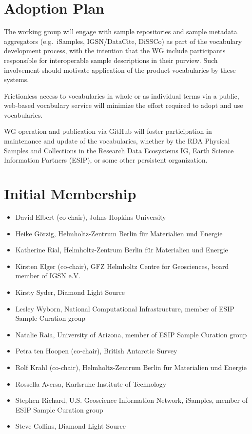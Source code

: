 \documentclass{scrartcl}
\begin{document}
\section{Adoption Plan}

The working group will engage with sample repositories and sample
metadata aggregators (e.g.\ iSamples, IGSN/DataCite, DiSSCo) as part
of the vocabulary development process, with the intention that the WG
include participants responsible for interoperable sample descriptions
in their purview.  Such involvement should motivate application of the
product vocabularies by these systems.

Frictionless access to vocabularies in whole or as individual terms
via a public, web-based vocabulary service will minimize the effort
required to adopt and use vocabularies.

WG operation and publication via GitHub will foster participation in
maintenance and update of the vocabularies, whether by the RDA
Physical Samples and Collections in the Research Data Ecosystems IG,
Earth Science Information Partners (ESIP), or some other persistent
organization.

\section{Initial Membership}

\begin{itemize}
\item David Elbert (co-chair), Johns Hopkins University
\item Heike Görzig,
  Helmholtz-Zentrum Berlin für Materialien und Energie
\item Katherine Rial,
  Helmholtz-Zentrum Berlin für Materialien und Energie
\item Kirsten Elger (co-chair),
  GFZ Helmholtz Centre for Geosciences, board member of IGSN e.V.
\item Kirsty Syder, Diamond Light Source
\item Lesley Wyborn,
  National Computational Infrastructure, member of ESIP Sample Curation group
\item Natalie Raia,
  University of Arizona, member of ESIP Sample Curation group
\item Petra ten Hoopen (co-chair), British Antarctic Survey
\item Rolf Krahl (co-chair),
  Helmholtz-Zentrum Berlin für Materialien und Energie
\item Rossella Aversa, Karlsruhe Institute of Technology
\item Stephen Richard,
  U.S. Geoscience Information Network, iSamples,
  member of ESIP Sample Curation group
\item Steve Collins, Diamond Light Source
\end{itemize}
\end{document}
